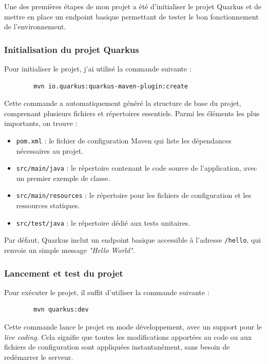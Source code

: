 \documentclass{article}
\begin{document}
	Une des premières étapes de mon projet a été d’initialiser le projet Quarkus et de mettre en place un endpoint basique permettant de tester le bon fonctionnement de l’environnement.
	
	\subsubsection{Initialisation du projet Quarkus}
	
	Pour initialiser le projet, j’ai utilisé la commande suivante :
	\begin{verbatim}
		mvn io.quarkus:quarkus-maven-plugin:create
	\end{verbatim}
	
	Cette commande a automatiquement généré la structure de base du projet, comprenant plusieurs fichiers et répertoires essentiels. Parmi les éléments les plus importants, on trouve :
	\begin{itemize}
		\item \texttt{pom.xml} : le fichier de configuration Maven qui liste les dépendances nécessaires au projet.
		\item \texttt{src/main/java} : le répertoire contenant le code source de l’application, avec un premier exemple de classe.
		\item \texttt{src/main/resources} : le répertoire pour les fichiers de configuration et les ressources statiques.
		\item \texttt{src/test/java} : le répertoire dédié aux tests unitaires.
	\end{itemize}
	
	Par défaut, Quarkus inclut un endpoint basique accessible à l’adresse \texttt{/hello}, qui renvoie un simple message \textit{"Hello World"}.
	
	\subsubsection{Lancement et test du projet}
	
	Pour exécuter le projet, il suffit d’utiliser la commande suivante :
	\begin{verbatim}
		mvn quarkus:dev
	\end{verbatim}
	
	Cette commande lance le projet en mode développement, avec un support pour le \textit{live coding}. Cela signifie que toutes les modifications apportées au code ou aux fichiers de configuration sont appliquées instantanément, sans besoin de redémarrer le serveur.
	
\end{document}
